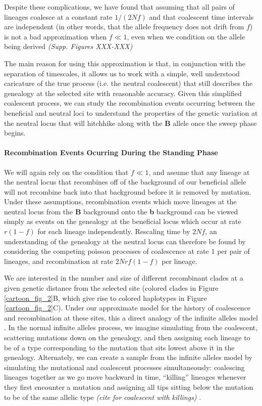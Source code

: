 \documentclass[a4paper,10pt]{article}
\newcommand{\jb}[1]{{\it\color{blue} (#1)} }
\begin{document}
Despite these complications, we have found that assuming that all pairs of lineages coalesce at a constant rate $1/(2 N f)$ and that coalescent time intervals are independent (in other words, that the allele frequency does not drift from $f$) is not a bad approximation when $f \ll 1$, even when we condition on the allele being derived \jb{Supp. Figures XXX-XXX}

The main reason for using this approximation is that, in conjunction with the separation of timescales, it allows us to work with a simple, well understood caricature of the true process (i.e. the neutral coalescent) that still describes the genealogy at the selected site with reasonable accuracy. Given this simplified coalescent process, we can study the recombination events occurring between the beneficial and neutral loci to understand the properties of the genetic variation at the neutral locus that will hitchhike along with the \textbf{B} allele once the sweep phase begins.

\paragraph{Recombination Events Ocurring During the Standing Phase}

We will again rely on the condition that $f \ll 1$, and assume that any lineage at the neutral locus that recombines off of the background of our beneficial allele will not recombine back into that background before it is removed by mutation. Under these assumptions, recombination events which move lineages at the neutral locus from the \textbf{B} background onto the \textbf{b} background can be viewed simply as events on the genealogy at the beneficial locus which occur at rate $r\left(1-f\right)$ for each lineage independently. Rescaling time by $2Nf$, an understanding of the genealogy at the neutral locus can therefore be found by considering the competing poisson processes of coalescence at rate $1$ per pair of lineages, and recombination at rate $2Nrf(1-f)$ per lineage.

We are interested in the number and size of different recombinant clades at a given genetic distance from the selected site (colored clades in Figure \ref{cartoon_fig_2}B, which give rise to colored haplotypes in Figure \ref{cartoon_fig_2}C). Under our approximate model for the history of coalescence and recombination at these sites, this a direct analogy of the infinite alleles model \citep{Kimura:1964wb,Watterson:1984wb}. In the normal infinite alleles process, we imagine simulating from the coalescent, scattering mutations down on the genealogy, and then assigning each lineage to be of a type corresponding to the mutation that sits lowest above it in the genealogy. Alternately, we can create a sample from the infinite alleles model by simulating the mutational and coalescent processes simultaneously: coalescing lineages together as we go move backward in time, ``killing'' lineages whenever they first encounter a mutation and assigning all tips sitting below the mutation to be of the same allelic type \jb{cite for coalescent with killings}.
\end{document}
